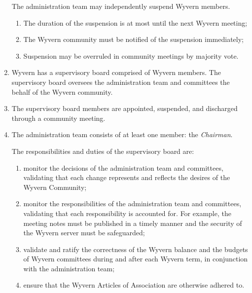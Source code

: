 \begin{enumerate}
    \begin{item}
        The administration team may independently suspend Wyvern members.
        \begin{enumerate}
            \item The duration of the suspension is at most until the next Wyvern meeting;
            \item The Wyvern community must be notified of the suspension immediately;
            \item Suspension may be overruled in community meetings by majority vote.
       \end{enumerate}
    \end{item}

    \item Wyvern has a supervisory board comprised of Wyvern members. The supervisory board oversees the administration team and committees the behalf of the Wyvern community.
    
    \item The supervisory board members are appointed, suspended, and discharged through a community meeting.
    
    \item The administration team consists of at least one member: the \emph{Chairman}.
    
    \begin{item}
        The responsibilities and duties of the supervisory board are:
        \begin{enumerate}
            \item monitor the decisions of the administration team and committees, validating that each change represents and reflects the desires of the Wyvern Community;
            \item monitor the responsibilities of the administration team and committees, validating that each responsibility is accounted for. For example, the meeting notes must be published in a timely manner and the security of the Wyvern server must be safeguarded;
            \item validate and ratify the correctness of the Wyvern balance and the budgets of Wyvern committees during and after each Wyvern term, in conjunction with  the administration team;
            \item ensure that the Wyvern Articles of Association are otherwise adhered to.
        \end{enumerate}
    \end{item}


\end{enumerate}
